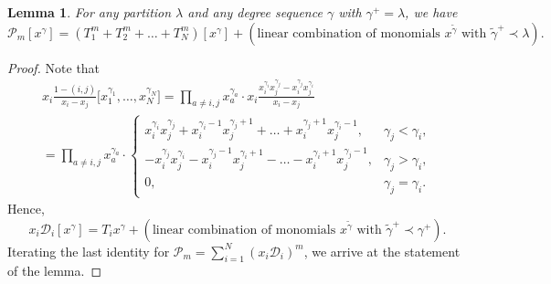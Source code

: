 \documentclass[11pt]{article}
\newtheorem{lemma}[theo]{Lemma}
\theoremstyle{definition}
\numberwithin{equation}{section}
\newcommand{\D}{\mathcal D}
\newcommand{\PP}{\mathcal P}
\begin{document}
\begin{lemma} \label{Lemma_triangularity}
 For any partition $\lambda$ and any degree sequence $\gamma$ with $\gamma^+=\lambda$, we have
{\small $$
 \PP_m[x^{\gamma}]=(T_1^m+T_2^m+\dots+T_N^m)[x^{\gamma}]+(\text{linear combination of monomials } x^{\tilde \gamma}\text{ with }\tilde \gamma^+\prec\lambda).
 $$}
\end{lemma}
\begin{proof}
 Note that
 \begin{multline}
   x_i \frac{1-(i,j)}{x_i-x_j} \bigl[x_1^{\gamma_1},\dots, x_N^{\gamma_N}\bigr]= \prod_{a\ne i,j} x_a^{\gamma_a} \cdot  x_i \frac{x_i^{\gamma_i} x_j^{\gamma_j}-x_i^{\gamma_j} x_j^{\gamma_i}}{x_i-x_j}\\
   = \prod_{a\ne i,j} x_a^{\gamma_a}\cdot \begin{cases} x_i^{\gamma_i} x_j^{\gamma_j}+ x_i^{\gamma_i-1} x_j^{\gamma_j+1}+\dots+ x_i^{\gamma_j+1} x_j^{\gamma_i-1},& \gamma_j<\gamma_i,\\
   -x_i^{\gamma_j} x_j^{\gamma_i}- x_i^{\gamma_j-1} x_j^{\gamma_i+1}-\dots- x_i^{\gamma_i+1} x_j^{\gamma_j-1},& \gamma_j>\gamma_i,\\
   0,& \gamma_j=\gamma_i. \end{cases}
 \end{multline}
Hence,
$$
 x_i \D_i [x^{\gamma}]= T_i x^{\gamma}+ (\text{linear combination of monomials } x^{\tilde \gamma}\text{ with }\tilde \gamma^+\prec\gamma^+).
$$
Iterating the last identity for $\PP_m=\sum_{i=1}^N (x_i \D_i)^m$, we arrive at the statement of the lemma.
\end{proof}
\end{document}
